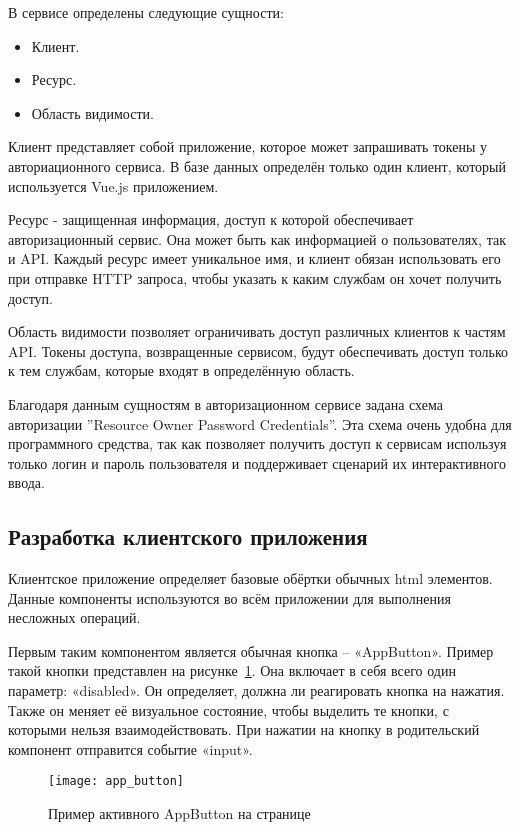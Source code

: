 В сервисе определены следующие сущности:

\begin{itemize}
    \item Клиент.
    \item Ресурс.
    \item Область видимости.
\end{itemize}

Клиент представляет собой приложение, которое может запрашивать токены у авториационного сервиса. В базе данных определён только один клиент, который используется Vue.js приложением.

Ресурс - защищенная информация, доступ к которой обеспечивает авторизационный сервис. Она может быть как информацией о пользователях, так и API. Каждый ресурс имеет уникальное имя, и клиент обязан использовать его при отправке HTTP запроса, чтобы указать к каким службам он хочет получить доступ.

Область видимости позволяет ограничивать доступ различных клиентов к частям API. Токены доступа, возвращенные сервисом, будут обеспечивать доступ только к тем службам, которые входят в определённую область.

Благодаря данным сущностям в авторизационном сервисе задана схема авторизации ''Resource Owner Password Credentials''. Эта схема очень удобна для программного средства, так как позволяет получить доступ к сервисам используя только логин и пароль пользователя и поддерживает сценарий их интерактивного ввода.

\subsection{Разработка клиентского приложения}\label{sec:development:client_app}

Клиентское приложение определяет базовые обёртки обычных html элементов. Данные компоненты используются во всём приложении для выполнения несложных операций.

Первым таким компонентом является обычная кнопка – «AppButton». Пример такой кнопки представлен на рисунке~\ref{fig:app_button}. Она включает в себя всего один параметр: «disabled». Он определяет, должна ли реагировать кнопка на нажатия. Также он меняет её визуальное состояние, чтобы выделить те кнопки, с которыми нельзя взаимодействовать. При нажатии на кнопку в родительский компонент отправится событие «input».

\begin{figure}[h]
    \centering
    \texttt{[image: app\_button]}
    \caption{Пример активного AppButton на странице}\label{fig:app_button}
\end{figure}

